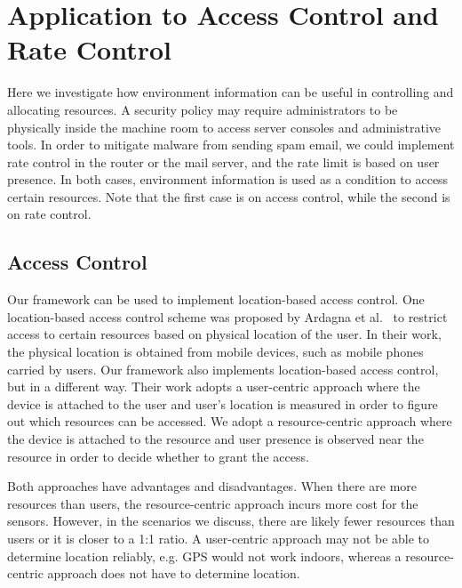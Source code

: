 \section{Application to Access Control and Rate Control}
\label{sec:sensor-acrate}

Here we investigate how environment information can be useful in
controlling and allocating resources.  A security policy may require
administrators to be physically inside the machine room to access
server consoles and administrative tools. In order to mitigate
malware from sending spam email, we could implement rate control in
the router or the mail server, and the rate limit is based on user
presence. In both cases, environment information is used as a
condition to access certain resources. Note that the first case is
on access control, while the second is on rate control.

\subsection{Access Control}
\label{sec:app-ac}

Our framework can be used to implement location-based access
control. One location-based access control scheme was proposed by Ardagna et
al.~\cite{ardagna2006supporting} to restrict access to certain resources
based on physical location of the user.
In their work, the physical location
is obtained from mobile devices, such as mobile phones carried by
users. Our framework also implements location-based access
control, but in a different way. Their work adopts a user-centric
approach where the device is attached to the user and
user's location is measured in order to figure out
which resources can be accessed.
We adopt a resource-centric approach where the device is attached to
the resource and user presence is observed near the resource in order
to decide whether to grant the access.

Both approaches have advantages and disadvantages.
When there are more resources than users, the resource-centric approach
incurs more cost for the sensors.
However, in the scenarios we discuss, there are likely fewer resources
than users or it is closer to a 1:1 ratio.
A user-centric approach may not be able to determine location
reliably, e.g. GPS would not work indoors,
whereas a resource-centric approach does not have to determine location.

